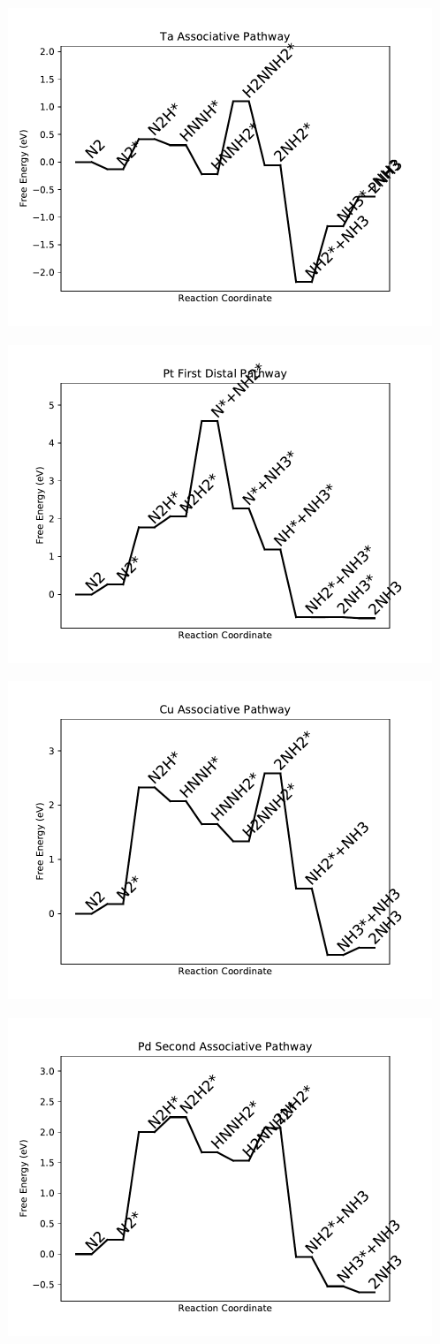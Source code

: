 \documentclass[journal=jacsat,manuscript=article]{achemso}
\begin{document}
\begin{figure}
\includegraphics[width=0.5\linewidth]{data/plots/Ta_associative.pdf}
\label{fig:Ta_associative}
\end{figure}

\newpage
\begin{figure}
\includegraphics[width=0.5\linewidth]{data/plots/Pt_distal_1.pdf}
\label{fig:Pt_distal_1}
\end{figure}

\begin{figure}
\includegraphics[width=0.5\linewidth]{data/plots/Cu_associative.pdf}
\label{fig:Cu_associative}
\end{figure}

\newpage
\begin{figure}
\includegraphics[width=0.5\linewidth]{data/plots/Pd_associative_2.pdf}
\label{fig:Pd_associative_2}
\end{figure}
\end{document}
